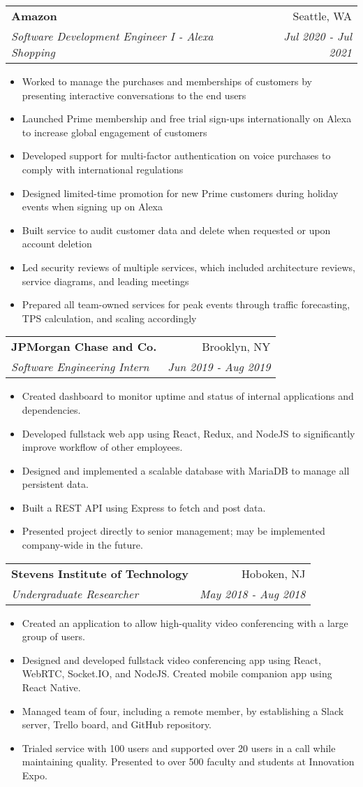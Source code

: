 \documentclass[letterpaper,11pt]{article}
\makeatletter
\newcommand{\resumeItem}[1]{
  \item\small{
    {#1 \vspace{-2pt}}
  }
}
\newcommand{\resumeSubheading}[4]{
  \vspace{-1pt}\item
    \begin{tabular*}{0.97\textwidth}{l@{\extracolsep{\fill}}r}
      \textbf{#1} & #2 \\
      \textit{\small#3} & \textit{\small #4} \\
    \end{tabular*}\vspace{-5pt}
}
\newcommand{\resumeItemListStart}{\begin{itemize}}
\newcommand{\resumeItemListEnd}{\end{itemize}\vspace{-5pt}}
\makeatother
\begin{document}
    \resumeSubheading
      {Amazon}{Seattle, WA}
      {Software Development Engineer I - Alexa Shopping}{Jul 2020 - Jul 2021}
      \resumeItemListStart
        \resumeItem
          {Worked to manage the purchases and memberships of customers by presenting interactive conversations to the end users}
        \resumeItem
          {Launched Prime membership and free trial sign-ups internationally on Alexa to increase global engagement of customers}
        \resumeItem
          {Developed support for multi-factor authentication on voice purchases to comply with international regulations}
        \resumeItem
          {Designed limited-time promotion for new Prime customers during holiday events when signing up on Alexa}
        \resumeItem
          {Built service to audit customer data and delete when requested or upon account deletion}
        \resumeItem
          {Led security reviews of multiple services, which included architecture reviews, service diagrams, and leading meetings}
        \resumeItem
          {Prepared all team-owned services for peak events through traffic forecasting, TPS calculation, and scaling accordingly}
      \resumeItemListEnd

    \resumeSubheading
      {JPMorgan Chase and Co.}{Brooklyn, NY}
      {Software Engineering Intern}{Jun 2019 - Aug 2019}
      \resumeItemListStart
        \resumeItem
          {Created dashboard to monitor uptime and status of internal applications and dependencies.}
        \resumeItem
          {Developed fullstack web app using React, Redux, and NodeJS to significantly improve workflow of other employees.}
        \resumeItem
          {Designed and implemented a scalable database with MariaDB to manage all persistent data.}
        \resumeItem
          {Built a REST API using Express to fetch and post data.}
        \resumeItem
          {Presented project directly to senior management; may be implemented company-wide in the future.}
      \resumeItemListEnd

    \resumeSubheading
      {Stevens Institute of Technology}{Hoboken, NJ}
      {Undergraduate Researcher}{May 2018 - Aug 2018}
      \resumeItemListStart
        \resumeItem
          {Created an application to allow high-quality video conferencing with a large group of users.}
        \resumeItem
          {Designed and developed fullstack video conferencing app using React, WebRTC, Socket.IO, and NodeJS. Created mobile companion app using React Native.}
        \resumeItem
          {Managed team of four, including a remote member, by establishing a Slack server, Trello board, and GitHub repository.}
        \resumeItem
          {Trialed service with 100 users and supported over 20 users in a call while maintaining quality. Presented to over 500 faculty and students at Innovation Expo.}
      \resumeItemListEnd
\end{document}
